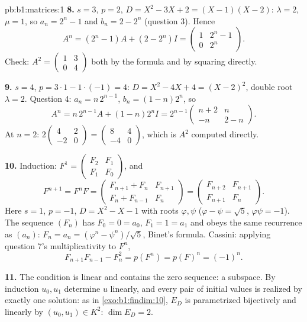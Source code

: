 \begin{solution}{pb:b1:matrices:1}
\textbf{8.} $s = 3$, $p = 2$, $D = X^2 - 3X + 2 = (X - 1)(X -
2)$: $\lambda = 2$, $\mu = 1$, so $a_n = 2^n - 1$ and $b_n = 2 -
2^n$ (question 3). Hence
\[
A^n = (2^n - 1)A + (2 - 2^n)I
= \begin{pmatrix} 1 & 2^n - 1\\ 0 & 2^n \end{pmatrix}.
\]
Check: $A^2 = \begin{pmatrix} 1 & 3\\ 0 & 4\end{pmatrix}$ both
by the formula and by squaring directly.

\textbf{9.} $s = 4$, $p = 3\cdot1 - 1\cdot(-1) = 4$: $D = X^2 -
4X + 4 = (X - 2)^2$, double root $\lambda = 2$. Question 4: $a_n
= n\,2^{n-1}$, $b_n = (1 - n)2^n$, so
\[
A^n = n\,2^{n-1}A + (1 - n)2^n I
= 2^{n-1}\begin{pmatrix} n + 2 & n\\ -n & 2 - n
\end{pmatrix}.
\]
At $n = 2$: $2\begin{pmatrix} 4 & 2\\ -2 & 0\end{pmatrix} =
\begin{pmatrix} 8 & 4\\ -4 & 0 \end{pmatrix}$, which is $A^2$
computed directly.

\textbf{10.} Induction: $F^1 = \begin{pmatrix} F_2 & F_1\\ F_1 &
F_0\end{pmatrix}$, and
\[
F^{n+1} = F^n F =
\begin{pmatrix} F_{n+1} + F_n & F_{n+1}\\
F_n + F_{n-1} & F_n \end{pmatrix}
= \begin{pmatrix} F_{n+2} & F_{n+1}\\ F_{n+1} & F_n
\end{pmatrix}.
\]
Here $s = 1$, $p = -1$, $D = X^2 - X - 1$ with roots $\varphi,
\psi$ ($\varphi - \psi = \sqrt5$, $\varphi\psi = -1$). The
sequence $(F_n)$ has $F_0 = 0 = a_0$, $F_1 = 1 = a_1$ and obeys
the same recurrence as $(a_n)$: $F_n = a_n = (\varphi^n -
\psi^n)/\sqrt5$, Binet's formula. Cassini: applying question 7's
multiplicativity to $F^n$,
\[
F_{n+1}F_{n-1} - F_n^2 = p(F^n) = p(F)^n = (-1)^n .
\]

\textbf{11.} The condition is linear and contains the zero
sequence: a subspace. By induction $u_0, u_1$ determine $u$
linearly, and every pair of initial values is realized by
exactly one solution: as in \cref{exo:b1:findim:10}, $E_D$ is
parametrized bijectively and linearly by $(u_0, u_1) \in K^2$:
$\dim E_D = 2$.


\end{solution}
